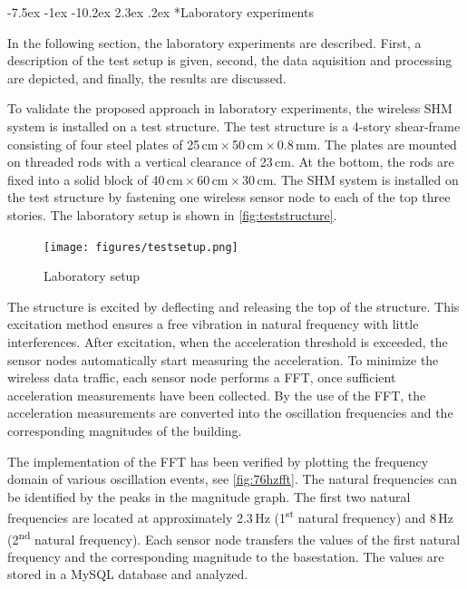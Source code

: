 \documentclass[12pt,a4paper]{scrartcl}
\makeatletter
\renewcommand\section{\@startsection{section}{1}{\z@}%
                     {-7.5ex \@plus -1ex \@minus -10.2ex}%
                     {2.3ex \@plus.2ex}%
                     {\sffamily\large\bfseries}}
\makeatother
\begin{document}


\section*{Laboratory experiments}

In the following section, the laboratory experiments are described.
First, a description of the test setup is given, second, the data aquisition and processing are depicted, and finally, the results are discussed. 

To validate the proposed approach in laboratory experiments, the wireless SHM system is installed on a test structure.
The test structure is a 4-story shear-frame consisting of four steel plates of 25\,cm\,$\times$\,50\,cm\,$\times$\,0.8\,mm.
The plates are mounted on threaded rods with a vertical clearance of 23\,cm.
At the bottom, the rods are fixed into a solid block of 40\,cm\,$\times$\,60\,cm\,$\times$\,30\,cm.
The SHM system is installed on the test structure by fastening one wireless sensor node to each of the top three stories.
The laboratory setup is shown in \autoref{fig:teststructure}.

\begin{figure}[ht]
    \centering
    \texttt{[image: figures/testsetup.png]}
    \caption{Laboratory setup}
    \label{fig:teststructure}
\end{figure}

The structure is excited by deflecting and releasing the top of the structure.
This excitation method ensures a free vibration in natural frequency with little interferences.
After excitation, when the acceleration threshold is exceeded, the sensor nodes automatically start measuring the acceleration.
To minimize the wireless data traffic, each sensor node performs a FFT, once sufficient acceleration measurements have been collected.
By the use of the FFT, the acceleration measurements are converted into the oscillation frequencies and the corresponding magnitudes of the building.

The implementation of the FFT has been verified by plotting the frequency domain of various oscillation events, see \autoref{fig:76hzfft}.
The natural frequencies can be identified by the peaks in the magnitude graph.
The first two natural frequencies are located at approximately 2.3\,Hz (1\textsuperscript{st} natural frequency) and 8\,Hz (2\textsuperscript{nd} natural frequency).
Each sensor node transfers the values of the first natural frequency and the corresponding magnitude to the basestation. 
The values are stored in a MySQL database and analyzed.
\end{document}

